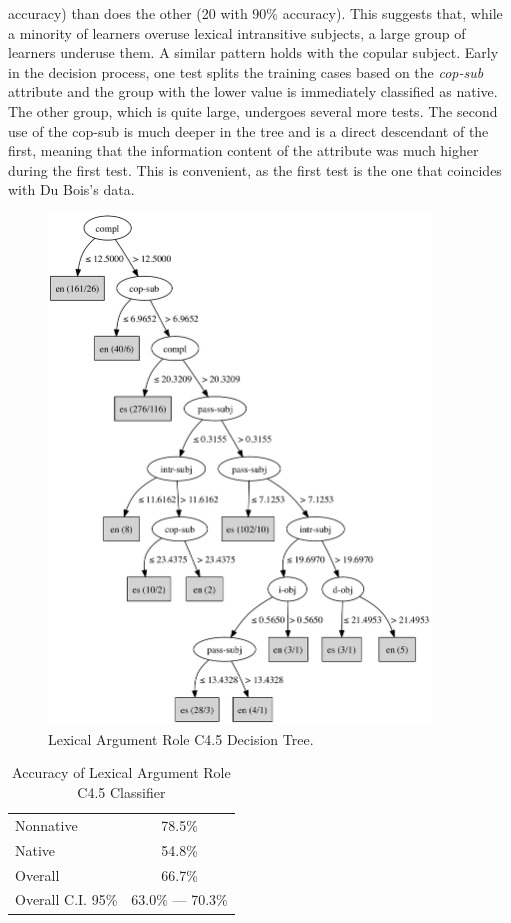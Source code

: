 \documentclass[main.tex]{subfiles}
\begin{document}
accuracy) than does the other (20 with 90\% accuracy). This suggests that, while a minority of learners overuse lexical intransitive subjects, a large group of learners underuse them. A similar pattern holds with the copular subject. Early in the decision process, one test splits the training cases based on the \textit{cop-sub} attribute and the group with the lower value is immediately classified as native. The other group, which is quite large, undergoes several more tests. The second use of the cop-sub is much deeper in the tree and is a direct descendant of the first, meaning that the information content of the attribute was much higher during the first test. This is convenient, as the first test is the one that coincides with Du Bois's data. 

\begin{figure}[ht]
\centering
\includegraphics[width=4in]{c45-lex-role.pdf}
\caption{Lexical Argument Role C4.5 Decision Tree.}
\label{fig:c4.5-lex-role}
\end{figure}

\begin{table}[ht]
\centering
\caption{Accuracy of Lexical Argument Role C4.5 Classifier}
\begin{tabular}{l c}
\toprule
Nonnative & 78.5\% \\
Native & 54.8\%\\
Overall & 66.7\% \\
Overall C.I. 95\% & 63.0\% --- 70.3\%\\
\bottomrule
\end{tabular}
\label{table:lex-role-results}
\end{table}
\end{document}
